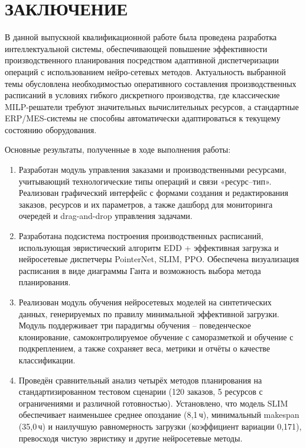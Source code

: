 \section*{ЗАКЛЮЧЕНИЕ}

В данной выпускной квалификационной работе была проведена разработка интеллектуальной системы, обеспечивающей повышение эффективности производственного планирования посредством адаптивной диспетчеризации операций с использованием нейро-сетевых методов. Актуальность выбранной темы обусловлена необходимостью оперативного составления производственных расписаний в условиях гибкого дискретного производства, где классические MILP-решатели требуют значительных вычислительных ресурсов, а стандартные ERP/MES-системы не способны автоматически адаптироваться к текущему состоянию оборудования.

Основные результаты, полученные в ходе выполнения работы:
\begin{enumerate}
\item Разработан модуль управления заказами и производственными ресурсами, учитывающий технологические типы операций и связи «ресурс–тип». Реализован графический интерфейс с формами создания и редактирования заказов, ресурсов и их параметров, а также дашборд для мониторинга очередей и drag-and-drop управления задачами.
\item Разработана подсистема построения производственных расписаний, использующая эвристический алгоритм EDD + эффективная загрузка и нейросетевые диспетчеры PointerNet, SLIM, PPO. Обеспечена визуализация расписания в виде диаграммы Ганта и возможность выбора метода планирования.
\item Реализован модуль обучения нейросетевых моделей на синтетических данных, генерируемых по правилу минимальной эффективной загрузки. Модуль поддерживает три парадигмы обучения – поведенческое клонирование, самоконтролируемое обучение с саморазметкой и обучение с подкреплением, а также сохраняет веса, метрики и отчёты о качестве классификации.
\item Проведён сравнительный анализ четырёх методов планирования на стандартизированном тестовом сценарии (120 заказов, 5 ресурсов с ограничениями и различной готовностью). Установлено, что модель SLIM обеспечивает наименьшее среднее опоздание (8,1\,ч), минимальный makespan (35,0\,ч) и наилучшую равномерность загрузки (коэффициент вариации 0,171), превосходя чистую эвристику и другие нейросетевые методы.
\end{enumerate}

